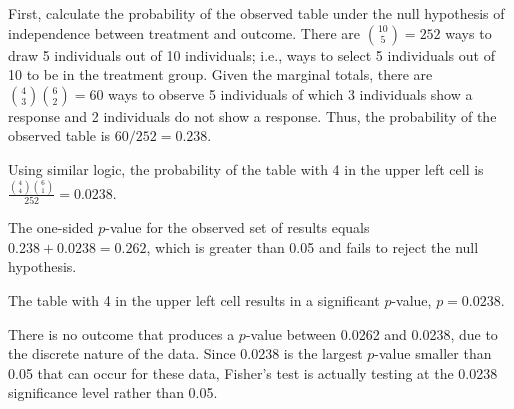 \begin{examplewrap}
\begin{nexample}
		First, calculate the probability of the observed table under the null hypothesis of independence between treatment and outcome. There are ${10 \choose 5} = 252$ ways to draw 5 individuals out of 10 individuals; i.e., ways to select 5 individuals out of 10 to be in the treatment group. Given the marginal totals, there are  ${4 \choose 3} {6 \choose 2} = 60$ ways to observe 5 individuals of which 3 individuals show a response and 2 individuals do not show a response. Thus, the probability of the observed table is $60/252 = 0.238$.
		
		Using similar logic, the probability of the table with 4 in the upper left cell is $\frac{{4 \choose 4} {6 \choose 1}}{252} = 0.0238$.
		
		The one-sided $p$-value for the observed set of results equals $0.238 + 0.0238 = 0.262$, which is greater than 0.05 and fails to reject the null hypothesis.
		
		The table with 4 in the upper left cell results in a significant $p$-value, $p = 0.0238$.
		
		There is no outcome that produces a $p$-value between 0.0262 and 0.0238, due to the discrete nature of the data. Since 0.0238 is the largest $p$-value smaller than 0.05 that can occur for these data, Fisher's test is actually testing at the 0.0238 significance level rather than 0.05.
	\end{nexample}
\end{examplewrap}


